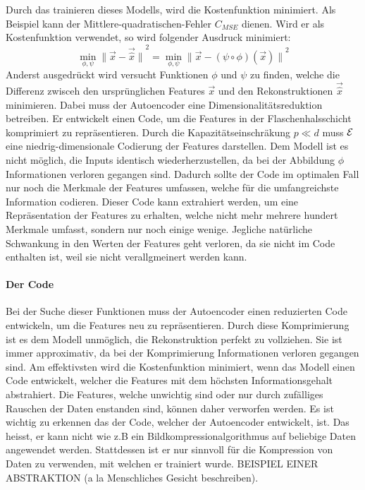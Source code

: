 Durch das trainieren dieses Modells, wird die Kostenfunktion minimiert. Als
Beispiel kann der Mittlere-quadratischen-Fehler $C_{MSE}$ dienen.
Wird er als Kostenfunktion verwendet, so wird folgender Ausdruck minimiert:
\begin{equation}
  \min_{\phi,\psi} {\|\vec{x} - \vec{\hat{x}}\|}^2 = \min_{\phi,\psi} {\|\vec{x} - (\psi \circ \phi)(\vec{x})\|}^2
\end{equation}
Anderst ausgedrückt wird versucht Funktionen $\phi$ und $\psi$ zu finden, welche
die Differenz zwisceh den ursprünglichen Features $\vec{x}$ und den Rekonstruktionen
$\vec{\hat{x}}$ minimieren. Dabei muss der Autoencoder
eine Dimensionalitätsreduktion betreiben. Er entwickelt einen Code, um die Features
in der Flaschenhalsschicht komprimiert zu repräsentieren. Durch die
Kapazitätseinschräkung $p \ll d$ muss $\mathcal{E}$ eine niedrig-dimensionale
Codierung der Features darstellen. Dem Modell ist es nicht möglich, die Inputs
identisch wiederherzustellen, da bei der Abbildung $\phi$ Informationen verloren
gegangen sind. Dadurch sollte der Code im optimalen Fall nur noch die Merkmale
der Features umfassen, welche für die umfangreichste Information codieren.
Dieser Code kann extrahiert werden, um eine Repräsentation der Features zu
erhalten, welche nicht mehr mehrere hundert Merkmale umfasst, sondern nur noch einige
wenige. Jegliche natürliche Schwankung in den Werten der Features geht
verloren, da sie nicht im Code enthalten ist, weil sie nicht verallgmeinert
werden kann.

\paragraph{Der Code}
Bei der Suche dieser Funktionen muss der Autoencoder einen reduzierten Code
entwickeln, um die Features neu zu repräsentieren.
Durch diese Komprimierung ist es dem Modell unmöglich, die Rekonstruktion
perfekt zu vollziehen. Sie ist immer approximativ, da bei der Komprimierung
Informationen verloren gegangen sind. Am effektivsten wird die Kostenfunktion
minimiert, wenn das Modell einen Code entwickelt, welcher die Features mit dem
höchsten Informationsgehalt abstrahiert. Die Features, welche unwichtig sind
oder nur durch zufälliges Rauschen der Daten enstanden sind, können daher verworfen werden.
\para{}
Es ist wichtig zu erkennen das der Code, welcher der Autoencoder entwickelt,
 ist. Das heisst, er kann nicht wie z.B ein
Bildkompressionalgorithmus auf beliebige Daten angewendet werden. Stattdessen
ist er nur sinnvoll für die Kompression von Daten zu verwenden, mit welchen er trainiert
wurde.
BEISPIEL EINER ABSTRAKTION (a la Menschliches Gesicht beschreiben).

